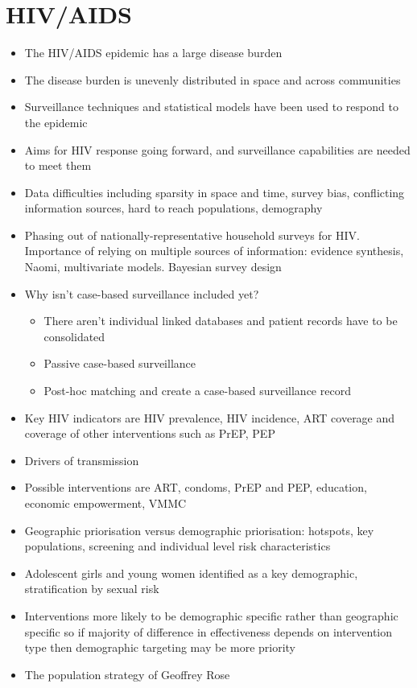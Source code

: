 \documentclass[a4paper, nobind]{templates/ociamthesis}
\providecommand{\tightlist}{%
  \setlength{\itemsep}{0pt}\setlength{\parskip}{0pt}}
\begin{document}
\hypertarget{hivaids}{%
\section{HIV/AIDS}\label{hivaids}}

\begin{itemize}
\tightlist
\item
  The HIV/AIDS epidemic has a large disease burden
\item
  The disease burden is unevenly distributed in space and across communities
\item
  Surveillance techniques and statistical models have been used to respond to the epidemic
\item
  Aims for HIV response going forward, and surveillance capabilities are needed to meet them
\item
  Data difficulties including sparsity in space and time, survey bias, conflicting information sources, hard to reach populations, demography
\item
  Phasing out of nationally-representative household surveys for HIV. Importance of relying on multiple sources of information: evidence synthesis, Naomi, multivariate models. Bayesian survey design
\item
  Why isn't case-based surveillance included yet?

  \begin{itemize}
  \tightlist
  \item
    There aren't individual linked databases and patient records have to be consolidated
  \item
    Passive case-based surveillance
  \item
    Post-hoc matching and create a case-based surveillance record
  \end{itemize}
\item
  Key HIV indicators are HIV prevalence, HIV incidence, ART coverage and coverage of other interventions such as PrEP, PEP
\item
  Drivers of transmission
\item
  Possible interventions are ART, condoms, PrEP and PEP, education, economic empowerment, VMMC
\item
  Geographic priorisation versus demographic priorisation: hotspots, key populations, screening and individual level risk characteristics
\item
  Adolescent girls and young women identified as a key demographic, stratification by sexual risk
\item
  Interventions more likely to be demographic specific rather than geographic specific so if majority of difference in effectiveness depends on intervention type then demographic targeting may be more priority
\item
  The population strategy of Geoffrey Rose
\end{itemize}
\end{document}
